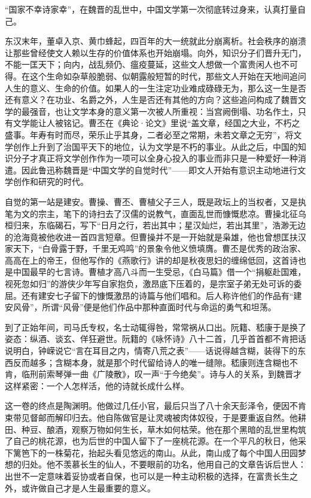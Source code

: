 
\begin{intro}
“国家不幸诗家幸”，在魏晋的乱世中，中国文学第一次彻底转过身来，认真打量自己。

东汉末年，董卓入京、黄巾蜂起，四百年的大一统就此分崩离析。社会秩序的崩溃让那些曾经使文人赖以生存的价值体系也开始崩塌。向外，知识分子们晋升无门，不能一匡天下；向内，战乱频仍、瘟疫蔓延，这些文人想做一个富贵闲人也不可得。在这个生命如杂草般脆弱、似朝露般短暂的时代，那些文人开始在天地间追问人生的意义、生命的价值。如果人的一生注定功业难成碌碌无为，那么这一生是否还有意义？在功业、名爵之外，人生是否还有其他的方向？这些追问构成了魏晋文学的最强音，也让文学本身的意义第一次被人所重视：当宫阙倒塌、功名作土，只有文学能让人被铭记。曹丕在《典论·论文》里说“盖文章，经国之大业，不朽之盛事。年寿有时而尽，荣乐止乎其身，二者必至之常期，未若文章之无穷”，将文学创作上升到了治国平天下的地位，认为文学是不朽的事业。从此之后，中国的知识分子才真正将文学创作作为一项可以全身心投入的事业而非只是一种爱好一种消遣。因此鲁迅称魏晋是“中国文学的自觉时代”——即文人开始有意识主动地进行文学创作和研究的时代。

自觉的第一站是建安。曹操、曹丕、曹植父子三人，既是政坛上的当权者，又是执笔为文的宗主，笔下的诗扫去了汉儒的说教气，直面乱世而慷慨悲凉。曹操北征乌桓归来，东临碣石，写下“日月之行，若出其中；星汉灿烂，若出其里”，浩渺无边的沧海竟被他收进一首四言短章。但曹操并不是一开始就是枭雄，他也曾想匡扶汉家天下，“白骨露于野，千里无鸡鸣”的景象令他义愤填膺。曹丕是优秀的政治家、高高在上的帝王，但他写作的《燕歌行》讲的却是秋夜思妇的缠绵低回，这首诗也是中国最早的七言诗。曹植才高八斗而一生受忌，《白马篇》借一个“捐躯赴国难，视死忽如归”的游侠少年写自家抱负，激昂底下压着的，是宗室子弟无处可诉的委屈。还有建安七子留下的慷慨激昂的诗篇与他们唱和。后人称许他们的作品有“建安风骨”，所谓“风骨”便是他们作品中那种直面时代与命运的勇气和坦荡。

到了正始年间，司马氏专权，名士动辄得咎，常常祸从口出。阮籍、嵇康于是换了姿态：纵酒、谈玄、佯狂避世。阮籍的《咏怀诗》八十二首，几乎首首都不肯把话说明白，钟嵘说它“言在耳目之内，情寄八荒之表”——话说得越含糊，装得下的东西反而越多；含糊本身，就是那个时代留给诗人的唯一缝隙。嵇康则连含糊也不肯，临刑前索琴弹一曲《广陵散》，叹一声“于今绝矣”。诗与人的关系，到魏晋才这样紧密：一个人怎样活，他的诗就长成什么样。

这一卷的终点是陶渊明。他做过几任小官，最后只当了八十余天彭泽令，便因不肯束带见督邮而解印归去。他自陈做官是让灵魂被肉体奴役，于是要重返自然。他耕田、种豆、酿酒，观察万物如何生长，草木如何枯荣。他在那个黑暗的乱世里构筑了自己的桃花源，也为后世的中国人留下了一座桃花源。在一个平凡的秋日，他采下篱笆下的一株菊花，抬起头看见悠远的南山。从此，南山成了每个中国人田园梦想的归处。他不羡慕长生的仙人，不要眼前的功名，他用自己的文章告诉后世人：出世不一定意味着妥协或者自保，也可以是一种主动积极的选择，在富贵长生之外，或许做自己才是人生最重要的意义。
\end{intro}
